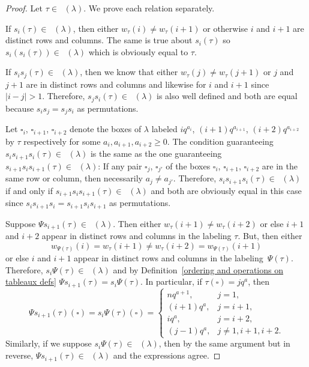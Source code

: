 \documentclass[10pt,a4paper]{amsart}
\numberwithin{equation}{section}
\theoremstyle{definition}
\DeclareMathOperator{\PSYT}{\mathrm{PSYT}_{\geq 0}}
\begin{document}
\begin{proof}
Let $\tau \in \PSYT(\lambda)$. We prove each relation separately.

If $s_i(\tau) \in \PSYT(\lambda)$, then either $w_{\tau}(i) \neq w_{\tau}(i+1)$ or otherwise $i$ and $i+1$ are distinct rows and columns. The same is true about $s_i(\tau)$ so $s_i(s_i(\tau)) \in \PSYT(\lambda)$ which is obviously equal to $\tau$.

If $s_is_j(\tau) \in \PSYT(\lambda)$, then we know that either $w_{\tau}(j) \neq w_{\tau}(j+1)$ or $j$ and $j+1$ are in distinct rows and columns and likewise for $i$ and $i+1$ since $|i-j| > 1$. Therefore, $s_js_i(\tau) \in \PSYT(\lambda)$ is also well defined and both are equal because $s_is_j = s_js_i$ as permutations.

Let $\square_i$, $\square_{i+1}$, $\square_{i+2}$ denote the boxes of $\lambda$ labeled $iq^{a_i}$, $(i+1)q^{a_{i+1}}$, $(i+2)q^{a_{i+2}}$ by $\tau$ respectively for some $a_i,a_{i+1},a_{i+2} \geq 0$. The condition guaranteeing $s_is_{i+1}s_i(\tau) \in \PSYT(\lambda)$ is the same as the one guaranteeing $s_{i+1}s_is_{i+1}(\tau) \in \PSYT(\lambda)$: If any pair $\square_j$, $\square_{j'}$ of the boxes $\square_i$, $\square_{i+1}$, $\square_{i+2}$ are in the same row or column, then necessarily $a_{j} \neq a_{j'}$. Therefore, $s_is_{i+1}s_i(\tau)\in \PSYT(\lambda)$ if and only if $s_{i+1}s_is_{i+1}(\tau) \in \PSYT(\lambda)$ and both are obviously equal in this case since $s_{i}s_{i+1}s_{i} = s_{i+1}s_is_{i+1}$ as permutations.

Suppose $\Psi s_{i+1}(\tau) \in \PSYT(\lambda)$. Then either $w_{\tau}(i+1) \neq w_{\tau}(i+2)$ or else $i+1$ and $i+2$ appear in distinct rows and columns in the labeling $\tau$. But, then either
\[w_{\Psi(\tau)}(i) = w_{\tau}(i+1) \neq w_{\tau}(i+2)= w_{\Psi(\tau)}(i+1)
\]
 or else $i$ and $i+1$ appear in distinct rows and columns in the labeling~$\Psi(\tau)$. Therefore, $s_i\Psi(\tau) \in \PSYT(\lambda)$ and by Definition~\ref{ordering and operations on tableaux defs} $\Psi s_{i+1}(\tau) = s_i\Psi(\tau)$. In particular, if $\tau(\square) = jq^a$, then
\[
 \Psi s_{i+1}(\tau)(\square)=s_i\Psi(\tau)(\square) = \begin{cases}
 nq^{a+1}, & j=1 ,\\
 (i+1)q^{a}, & j=i+1,\\
 iq^a ,& j =i+2, \\
 (j-1)q^a, & j\neq 1,i+1,i+2 .
\end{cases}
\]
 Similarly, if we suppose $s_i\Psi(\tau) \in \PSYT(\lambda)$, then by the same argument but in reverse, $\Psi s_{i+1}(\tau) \in \PSYT(\lambda)$ and the expressions agree.


\end{proof}
\end{document}
